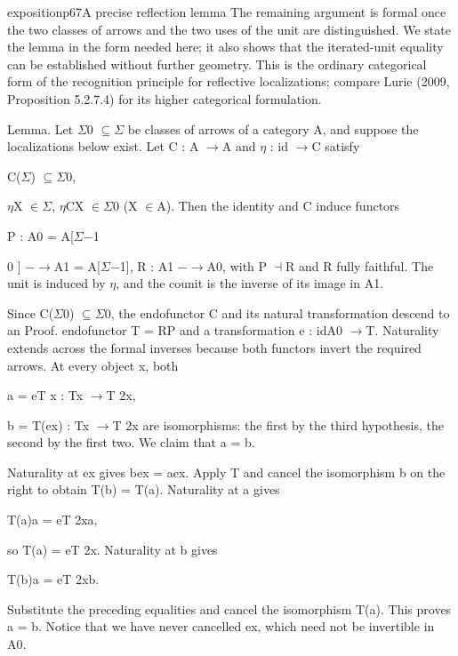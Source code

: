\begin{dcomment}{exposition}{p67}{A precise reflection lemma}
The remaining argument is formal once the two classes of arrows and the two uses of the unit are distinguished. We state the lemma in the form needed here; it also shows that the iterated-unit equality can be established without further geometry. This is the ordinary categorical form of the recognition principle for reflective localizations; compare Lurie (2009, Proposition 5.2.7.4) for its higher categorical formulation.

Lemma. Let \ensuremath{\Sigma}0 \ensuremath{\subseteq}\ensuremath{\Sigma} be classes of arrows of a category A, and suppose the localizations below exist. Let C : A \ensuremath{\to}A and \ensuremath{\eta} : id \ensuremath{\to}C satisfy

C(\ensuremath{\Sigma}) \ensuremath{\subseteq}\ensuremath{\Sigma}0,

\ensuremath{\eta}X \ensuremath{\in}\ensuremath{\Sigma}, \ensuremath{\eta}CX \ensuremath{\in}\ensuremath{\Sigma}0 (X \ensuremath{\in}A). Then the identity and C induce functors

P : A0 = A[\ensuremath{\Sigma}\ensuremath{-}1

0 ] \ensuremath{-}\ensuremath{\to}A1 = A[\ensuremath{\Sigma}\ensuremath{-}1], R : A1 \ensuremath{-}\ensuremath{\to}A0, with P \ensuremath{\dashv}R and R fully faithful. The unit is induced by \ensuremath{\eta}, and the counit is the inverse of its image in A1.

Since C(\ensuremath{\Sigma}0) \ensuremath{\subseteq}\ensuremath{\Sigma}0, the endofunctor C and its natural transformation descend to an Proof. endofunctor T = RP and a transformation e : idA0 \ensuremath{\to}T. Naturality extends across the formal inverses because both functors invert the required arrows. At every object x, both

a = eT x : Tx \ensuremath{\to}T 2x,

b = T(ex) : Tx \ensuremath{\to}T 2x are isomorphisms: the first by the third hypothesis, the second by the first two. We claim that a = b.

Naturality at ex gives bex = aex. Apply T and cancel the isomorphism b on the right to obtain T(b) = T(a). Naturality at a gives

T(a)a = eT 2xa,

so T(a) = eT 2x. Naturality at b gives

T(b)a = eT 2xb.

Substitute the preceding equalities and cancel the isomorphism T(a). This proves a = b. Notice that we have never cancelled ex, which need not be invertible in A0.


\end{dcomment}
